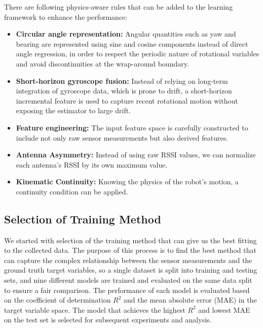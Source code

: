 \documentclass[subscriptcorrection,upint,varvw,barcolor=Goldenrod3,mathalfa=cal=euler,balance,hyphenate,pdf-a]{asmejour}
\begin{document}
There are following physics-aware rules that can be added to the learning framework to enhance the performance:
\begin{itemize}
  \item \textbf{Circular angle representation:} Angular quantities such as yaw and bearing are represented using sine and cosine components instead of direct angle regression, in order to respect the periodic nature of rotational variables and avoid discontinuities at the wrap-around boundary.
  \item \textbf{Short-horizon gyroscope fusion:} Instead of relying on long-term integration of gyroscope data, which is prone to drift, a short-horizon incremental feature is used to capture recent rotational motion without exposing the estimator to large drift.
  \item \textbf{Feature engineering:} The input feature space is carefully constructed to include not only raw sensor measurements but also derived features.
  \item \textbf{Antenna Asymmetry:} Instead of using raw RSSI values, we can normalize each antenna's RSSI by its own maximum value.
  \item \textbf{Kinematic Continuity:} Knowing the physics of the robot's motion, a continuity condition can be applied. 
\end{itemize}

\subsection{Selection of Training Method}
We started with selection of the training method that can give us the best fitting to the collected data. The purpose of this process is to find the best method that can capture the complex relationship between the sensor measurements and the ground truth target variables, so a single dataset is split into training and testing sets, and nine different models are trained and evaluated on the same data split to ensure a fair comparison. The performance of each model is evaluated based on the coefficient of determination \(R^2\) and the mean absolute error (MAE) in the target variable space. The model that achieves the highest \(R^2\) and lowest MAE on the test set is selected for subsequent experiments and analysis.
\end{document}
